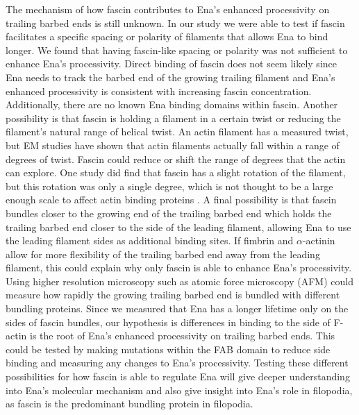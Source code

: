 The mechanism of how fascin contributes to Ena's enhanced processivity on trailing barbed ends is still unknown. In our study we were able to test if fascin facilitates a specific spacing or polarity of filaments that allows Ena to bind longer. We found that having fascin-like spacing or polarity was not sufficient to enhance Ena's processivity. Direct binding of fascin does not seem likely since Ena needs to track the barbed end of the growing trailing filament and Ena's enhanced processivity is consistent with increasing fascin concentration. Additionally, there are no known Ena binding domains within fascin. Another possibility is that fascin is holding a filament in a certain twist or reducing the filament's natural range of helical twist. An actin filament has a measured twist, but EM studies have shown that actin filaments actually fall within a range of degrees of twist. Fascin could reduce or shift the range of degrees that the actin can explore. One study did find that fascin has a slight rotation of the filament, but this rotation was only a single degree, which is not thought to be a large enough scale to affect actin binding proteins \citep{claessens_actin-binding_2006}. A final possibility is that fascin bundles closer to the growing end of the trailing barbed end which holds the trailing barbed end closer to the side of the leading filament, allowing Ena to use the leading filament sides as additional binding sites. If fimbrin and $\alpha$-actinin allow for more flexibility of the trailing barbed end away from the leading filament, this could explain why only fascin is able to enhance Ena's processivity. Using higher resolution microscopy such as atomic force microscopy (AFM) could measure how rapidly the growing trailing barbed end is bundled with different bundling proteins. Since we measured that Ena has a longer lifetime only on the sides of fascin bundles, our hypothesis is differences in binding to the side of F-actin is the root of Ena's enhanced processivity on trailing barbed ends. This could be tested by making mutations within the FAB domain to reduce side binding and measuring any changes to Ena's processivity. Testing these different possibilities for how fascin is able to regulate Ena will give deeper understanding into Ena's molecular mechanism and also give insight into Ena's role in filopodia, as fascin is the predominant bundling protein in filopodia.

